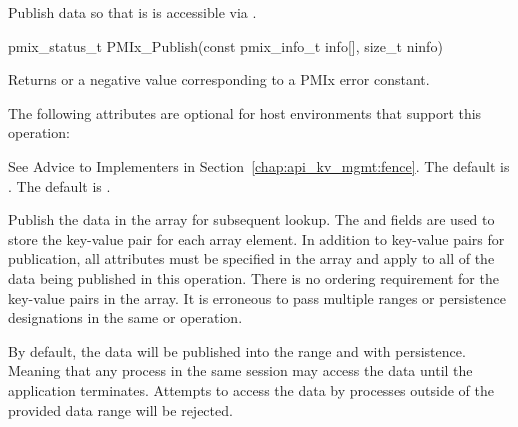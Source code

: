 \summary

Publish data so that is is accessible via .

\format

\cspecificstart
\begin{codepar}
pmix_status_t
PMIx_Publish(const pmix_info_t info[], size_t ninfo)
\end{codepar}
\cspecificend

\begin{arglist}
\end{arglist}

Returns  or a negative value corresponding to a PMIx error constant.

\optattrstart
The following attributes are optional for host environments that support this operation:

See Advice to Implementers in Section~\ref{chap:api_kv_mgmt:fence}.
\pastePRIAttributeItemEnd
{}
The default is .
\pastePRIAttributeItemEnd
{}
The default is .
\pastePRIAttributeItemEnd

\optattrend

\descr

Publish the data in the  array for subsequent lookup.
The  and  fields are used to store the key-value pair for each array element.
In addition to key-value pairs for publication, all attributes must be specified in the  array and apply to all of the data being published in this operation.
There is no ordering requirement for the key-value pairs in the  array.
It is erroneous to pass multiple ranges or persistence designations in the same  or  operation.

By default, the data will be published into the  range and with  persistence.
Meaning that any process in the same session may access the data until the application terminates.
Attempts to access the data by processes outside of the provided data range will be rejected.

